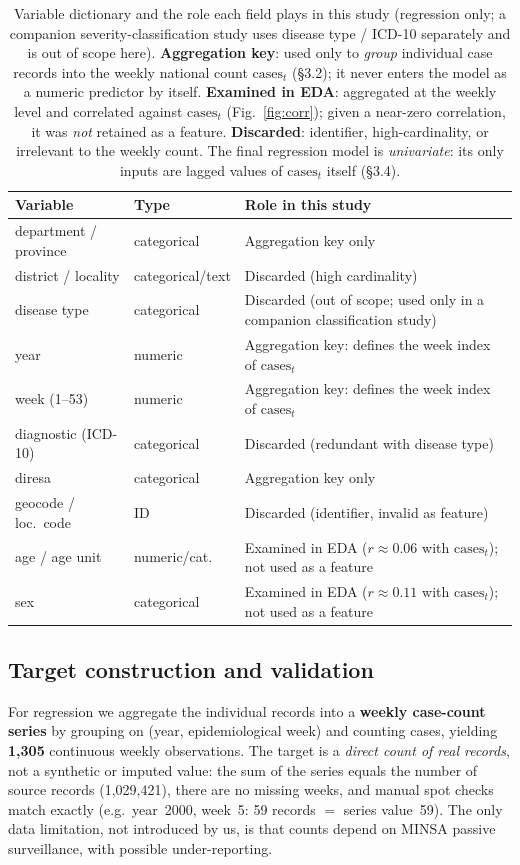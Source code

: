 \documentclass[runningheads]{llncs}
\begin{document}
\begin{table}[t]
\centering\footnotesize
\caption{Variable dictionary and the role each field plays in this study (regression only;
a companion severity-classification study uses disease type / ICD-10 separately and is out
of scope here). \textbf{Aggregation key}: used only to \emph{group} individual case records
into the weekly national count $\text{cases}_t$ (\S3.2); it never enters the model as a
numeric predictor by itself. \textbf{Examined in EDA}: aggregated at the weekly level and
correlated against $\text{cases}_t$ (Fig.~\ref{fig:corr}); given a near-zero correlation, it
was \emph{not} retained as a feature. \textbf{Discarded}: identifier, high-cardinality, or
irrelevant to the weekly count. The final regression model is \emph{univariate}: its only
inputs are lagged values of $\text{cases}_t$ itself (\S3.4).}
\label{tab:dict}
\begin{tabular}{@{}llp{3.6cm}@{}}
\toprule
Variable & Type & Role in this study \\
\midrule
department / province & categorical & Aggregation key only \\
district / locality & categorical/text & Discarded (high cardinality) \\
disease type & categorical & Discarded (out of scope; used only in a companion classification study) \\
year & numeric & Aggregation key: defines the week index of $\text{cases}_t$ \\
week (1--53) & numeric & Aggregation key: defines the week index of $\text{cases}_t$ \\
diagnostic (ICD-10) & categorical & Discarded (redundant with disease type) \\
diresa & categorical & Aggregation key only \\
geocode / loc.\ code & ID & Discarded (identifier, invalid as feature) \\
age / age unit & numeric/cat. & Examined in EDA ($r\approx0.06$ with $\text{cases}_t$); not used as a feature \\
sex & categorical & Examined in EDA ($r\approx0.11$ with $\text{cases}_t$); not used as a feature \\
\bottomrule
\end{tabular}
\end{table}

\subsection{Target construction and validation}
For regression we aggregate the individual records into a \textbf{weekly case-count series}
by grouping on (year, epidemiological week) and counting cases, yielding \textbf{1{,}305}
continuous weekly observations. The target is a \emph{direct count of real records}, not a
synthetic or imputed value: the sum of the series equals the number of source records
(1{,}029{,}421), there are no missing weeks, and manual spot checks match exactly
(e.g.\ year~2000, week~5: 59 records $=$ series value~59). The only data limitation, not
introduced by us, is that counts depend on MINSA passive surveillance, with possible
under-reporting.
\end{document}
